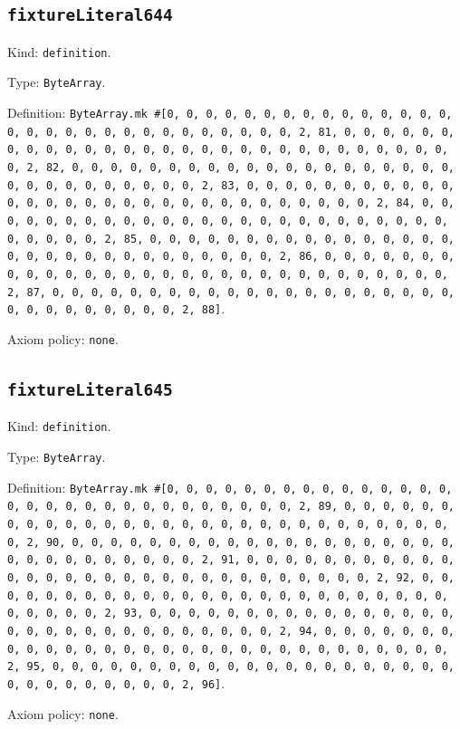 \documentclass[11pt]{article}
\begin{document}
\subsection*{\texttt{fixtureLiteral644}}
\noindent Kind: \texttt{definition}.\par
\noindent Type: \texttt{ByteArray}.\par
\noindent Definition: \texttt{ByteArray.mk \#[0, 0, 0, 0, 0, 0, 0, 0, 0, 0, 0, 0, 0, 0, 0, 0, 0, 0, 0, 0, 0, 0, 0, 0, 0, 0, 0, 0, 0, 0, 2, 81, 0, 0, 0, 0, 0, 0, 0, 0, 0, 0, 0, 0, 0, 0, 0, 0, 0, 0, 0, 0, 0, 0, 0, 0, 0, 0, 0, 0, 0, 0, 2, 82, 0, 0, 0, 0, 0, 0, 0, 0, 0, 0, 0, 0, 0, 0, 0, 0, 0, 0, 0, 0, 0, 0, 0, 0, 0, 0, 0, 0, 0, 0, 2, 83, 0, 0, 0, 0, 0, 0, 0, 0, 0, 0, 0, 0, 0, 0, 0, 0, 0, 0, 0, 0, 0, 0, 0, 0, 0, 0, 0, 0, 0, 0, 2, 84, 0, 0, 0, 0, 0, 0, 0, 0, 0, 0, 0, 0, 0, 0, 0, 0, 0, 0, 0, 0, 0, 0, 0, 0, 0, 0, 0, 0, 0, 0, 2, 85, 0, 0, 0, 0, 0, 0, 0, 0, 0, 0, 0, 0, 0, 0, 0, 0, 0, 0, 0, 0, 0, 0, 0, 0, 0, 0, 0, 0, 0, 0, 2, 86, 0, 0, 0, 0, 0, 0, 0, 0, 0, 0, 0, 0, 0, 0, 0, 0, 0, 0, 0, 0, 0, 0, 0, 0, 0, 0, 0, 0, 0, 0, 2, 87, 0, 0, 0, 0, 0, 0, 0, 0, 0, 0, 0, 0, 0, 0, 0, 0, 0, 0, 0, 0, 0, 0, 0, 0, 0, 0, 0, 0, 0, 0, 2, 88]}.\par
\noindent Axiom policy: \texttt{none}.\par
\subsection*{\texttt{fixtureLiteral645}}
\noindent Kind: \texttt{definition}.\par
\noindent Type: \texttt{ByteArray}.\par
\noindent Definition: \texttt{ByteArray.mk \#[0, 0, 0, 0, 0, 0, 0, 0, 0, 0, 0, 0, 0, 0, 0, 0, 0, 0, 0, 0, 0, 0, 0, 0, 0, 0, 0, 0, 0, 0, 2, 89, 0, 0, 0, 0, 0, 0, 0, 0, 0, 0, 0, 0, 0, 0, 0, 0, 0, 0, 0, 0, 0, 0, 0, 0, 0, 0, 0, 0, 0, 0, 2, 90, 0, 0, 0, 0, 0, 0, 0, 0, 0, 0, 0, 0, 0, 0, 0, 0, 0, 0, 0, 0, 0, 0, 0, 0, 0, 0, 0, 0, 0, 0, 2, 91, 0, 0, 0, 0, 0, 0, 0, 0, 0, 0, 0, 0, 0, 0, 0, 0, 0, 0, 0, 0, 0, 0, 0, 0, 0, 0, 0, 0, 0, 0, 2, 92, 0, 0, 0, 0, 0, 0, 0, 0, 0, 0, 0, 0, 0, 0, 0, 0, 0, 0, 0, 0, 0, 0, 0, 0, 0, 0, 0, 0, 0, 0, 2, 93, 0, 0, 0, 0, 0, 0, 0, 0, 0, 0, 0, 0, 0, 0, 0, 0, 0, 0, 0, 0, 0, 0, 0, 0, 0, 0, 0, 0, 0, 0, 2, 94, 0, 0, 0, 0, 0, 0, 0, 0, 0, 0, 0, 0, 0, 0, 0, 0, 0, 0, 0, 0, 0, 0, 0, 0, 0, 0, 0, 0, 0, 0, 2, 95, 0, 0, 0, 0, 0, 0, 0, 0, 0, 0, 0, 0, 0, 0, 0, 0, 0, 0, 0, 0, 0, 0, 0, 0, 0, 0, 0, 0, 0, 0, 2, 96]}.\par
\noindent Axiom policy: \texttt{none}.\par
\end{document}
